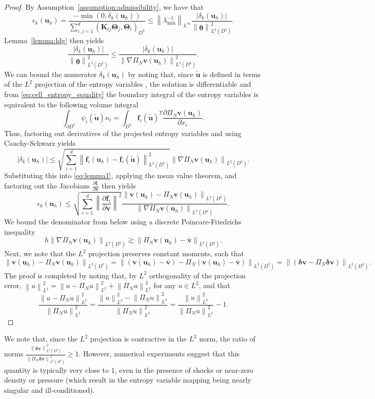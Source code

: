 \documentclass{elsarticle}
\theoremstyle{definition}
\theoremstyle{plain}
\theoremstyle{plain}
\newcommand{\pd}[2]{\frac{\partial#1}{\partial#2}}
\newcommand{\nor}[1]{\left\| #1 \right\|} %
\newcommand{\LRp}[1]{\left( #1 \right)} %
\newcommand{\LRb}[1]{\left| #1 \right|} %
\newcommand{\refone}[1]{{\color{red}#1}}
\renewcommand{\refone}[1]{#1}
\begin{document}
\begin{proof}
By Assumption~\ref{assumption:admissibility}, we have that
\[
\epsilon_k(\bm{u}_h) = \frac{-\min(0, \delta_k(\bm{u}_h))}{
\sum_{i,j=1}^d \LRp{\bm{K}_{ij}\bm{\Theta}_j, \bm{\Theta}_i}_{D^k}} 
\leq \nor{\lambda_{\min}^{-1}}_{L^\infty}\frac{\LRb{\delta_k(\bm{u}_h)}}{\nor{\bm{\theta}}^2_{L^2(D^k)}}.
\]
Lemma~\ref{lemma:ldg} then yields
\begin{equation}
\frac{\LRb{\delta_k(\bm{u}_h)}}{\nor{\bm{\theta}}_{L^2(D^k)}^2} \leq \frac{\LRb{\delta_k(\bm{u}_h)}}{\nor{\nabla \Pi_N \bm{v}(\bm{u}_h)}^2_{L^2(D^k)}}.
\label{eq:lemma1}
\end{equation}
We can bound the numerator $\delta_k(\bm{u}_h)$ by noting that, since $\tilde{\bm{u}}$ is defined in terms of the $L^2$ projection of the entropy variables \cite{chan2025artificial, colombo2022entropy}, the solution is differentiable and from \eqref{eq:cell_entropy_equality} the boundary integral of the entropy variables is equivalent to the following volume integral
\[
\int_{\partial D^k} \psi_i(\tilde{\bm{u}})n_i = \int_{D^k} \refone{\bm{f}_i(\tilde{\bm{u}})^T\pd{\Pi_N\bm{v}(\bm{u}_h)}{x_i}}. 
\]
Thus, factoring out derivatives of the projected entropy variables and using Cauchy-Schwarz yields
\[
\LRb{\delta_k(\bm{u}_h)} \leq \sqrt{\sum_{i=1}^d\nor{\bm{f}_i(\bm{u}_h) -\bm{f}_i(\tilde{\bm{u}})}_{L^2(D^k)}^2} \nor{\nabla \Pi_N \bm{v}(\bm{u}_h)}_{L^2(D^k)}  \refone{.}
\]
Substituting this into \eqref{eq:lemma1}, applying the mean value theorem, and factoring out the Jacobians $\pd{\bm{f}_i}{\bm{v}}$ then yields
\[
\epsilon_k(\bm{u}_h) \leq \sqrt{\sum_{i=1}^d \nor{\pd{\bm{f}_i}{\bm{v}}}^2}\frac{\nor{\bm{v}(\bm{u}_h) -\Pi_N\bm{v}(\bm{u}_h)}_{L^2(D^k)}}{\nor{\nabla \Pi_N \bm{v}(\bm{u}_h)}_{L^2(D^k)}}\refone{.}
\]
We  bound the denominator from below using a discrete Poincare-Friedrichs inequality \cite{brenner2003poincare, carstensen2018constants} 
\[
h\nor{\nabla \Pi_N \bm{v}(\bm{u}_h)}_{L^2(D^k)} \gtrsim  \nor{\Pi_N\bm{v}(\bm{u}_h) - \bar{\bm{v}}}_{L^2(D^k)}.
\]
Next, we note that the $L^2$ projection preserves constant moments, such that
\[
\nor{\bm{v}(\bm{u}_h) -\Pi_N\bm{v}(\bm{u}_h)}_{L^2(D^k)} = \nor{\LRp{\bm{v}(\bm{u}_h) - \bar{\bm{v}}} -\Pi_N\LRp{\bm{v}(\bm{u}_h)-\bar{\bm{v}}}}_{L^2(D^k)} = \nor{\LRp{\bm{\delta v} -\Pi_N\bm{\delta v}}}_{L^2(D^k)}.
\]
The proof is completed by noting that, by $L^2$ orthogonality of the projection error, $\nor{u}_{L^2}^2 = \nor{u - \Pi_Nu}_{L^2}^2 + \nor{\Pi_Nu}_{L^2}^2$ for any $u \in L^2$, and that
\[
\frac{\nor{u - \Pi_Nu}_{L^2}^2}{\nor{\Pi_Nu}_{L^2}^2} = \frac{\nor{u}_{L^2}^2 - \nor{\Pi_Nu}_{L^2}^2}{\nor{\Pi_Nu}_{L^2}^2} = \frac{\nor{u}_{L^2}^2}{\nor{\Pi_Nu}_{L^2}^2} - 1.
\]
\end{proof}
We note that, since the $L^2$ projection is contractive in the $L^2$ norm, the ratio of norms $\frac{\nor{\bm{\delta v}}_{L^2(D^k)}^2}{\nor{\Pi_N \bm{\delta v}}_{L^2(D^k)}^2} \geq 1$. However, numerical experiments suggest that this quantity is typically very close to $1$, even in the presence of shocks or near-zero density or pressure (which result in the entropy variable mapping being nearly singular and ill-conditioned). 
\end{document}
